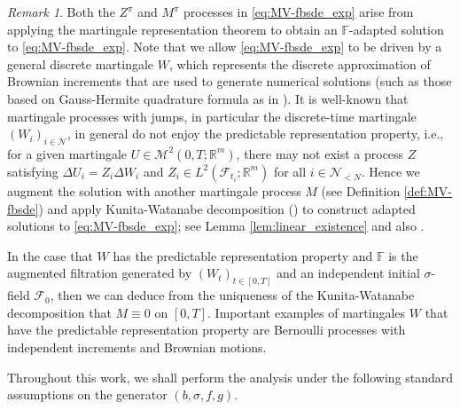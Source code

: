 \documentclass[11pt]{article}
\numberwithin{equation}{section}
\theoremstyle{definition}
\theoremstyle{remark}
\newtheorem{Remark}{Remark}[section]
\def\l{\label}  \def\f{\frac}  \def\fa{\forall}
\def\cF{\mathcal{F}}
\def\cM{\mathcal{M}}
\def\cN{\mathcal{N}}
\def\sF{{\mathbb{F}}}
\def\sR{{\mathbb R}}
\begin{document}
\begin{Remark}\l{rmk:predictable}
Both the $Z^\pi$ and  $M^\pi$ processes in \eqref{eq:MV-fbsde_exp} arise from applying the martingale representation theorem 
to obtain an $\sF$-adapted solution to
 \eqref{eq:MV-fbsde_exp}. 
 Note that
 we allow \eqref{eq:MV-fbsde_exp} to be driven by a general discrete martingale $W$,
 which represents the discrete
approximation of  Brownian increments
that are used to generate numerical solutions
(such as those  based on Gauss-Hermite quadrature formula
as  in \cite{picarelli2020}).
It is well-known that 
   martingale processes with jumps, in particular 
the discrete-time martingale $( W_i)_{i\in \cN}$,
in general do not enjoy the predictable representation property,
i.e.,  
for 
a given  martingale  $U\in \cM^2(0,T;\sR^m)$, there may not exist a  process $Z$ satisfying
$\Delta U_i=Z_i\Delta W_i$ and $Z_i\in L^2(\cF_{t_i};\sR^m)$ for all $i\in \cN_{<N}$.
Hence we augment the solution with another martingale process $M$ (see Definition \ref{def:MV-fbsde})
and  apply  Kunita-Watanabe decomposition (\cite[Theorem 10.18]{follmer2004})
   to construct  adapted solutions to
    \eqref{eq:MV-fbsde_exp}; 
    see Lemma \ref{lem:linear_existence} and  also \cite{bender2013,bielecki2015}.

In the case that 
 $W$ has the predictable representation property
and $\sF$ is
 the augmented filtration
generated by $(W_t)_{t\in [0,T]}$ and an independent initial $\sigma$-field $\cF_0$,
then 
we can deduce from the uniqueness of  the Kunita-Watanabe  decomposition  
that
$M\equiv0$ on $[0,T]$.
Important examples of  martingales $W$ that have the predictable representation property
are  
Bernoulli processes with independent increments
 and  Brownian motions.

\end{Remark}

Throughout this work,
we shall perform the analysis under the following standard assumptions on the generator $(b,\sigma,f,g)$.
\end{document}
